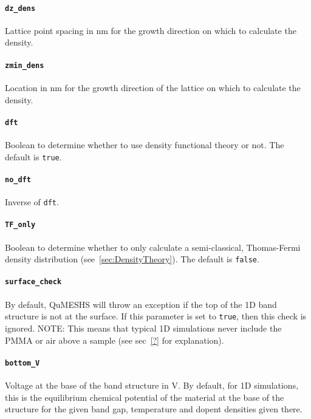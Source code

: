 \documentclass[12pt]{article}
\begin{document}
\paragraph{\texttt{dz\_dens}}
Lattice point spacing in nm for the growth direction on which to calculate the density.

\paragraph{\texttt{zmin\_dens}}
Location in nm for the growth direction of the lattice on which to calculate the density.

\paragraph{\texttt{dft}}
Boolean to determine whether to use density functional theory or not.  The default is
\texttt{true}.

\paragraph{\texttt{no\_dft}}
Inverse of \texttt{dft}.

\paragraph{\texttt{TF\_only}}
Boolean to determine whether to only calculate a semi-classical, Thomas-Fermi density
distribution (see~\ref{sec:DensityTheory}).  The default is \texttt{false}.

\paragraph{\texttt{surface\_check}}
By default, QuMESHS will throw an exception if the top of the 1D band structure is not at
the surface.  If this parameter is set to \texttt{true}, then this check is ignored.
{\color{red} NOTE:} This means that typical 1D simulations never include the PMMA or air
above a sample (see sec~\ref{?} for explanation).

\paragraph{\texttt{bottom\_V}}
Voltage at the base of the band structure in V.  By default, for 1D simulations, this is
the equilibrium chemical potential of the material at the base of the structure for the
given band gap, temperature and dopent densities given there.
\end{document}
